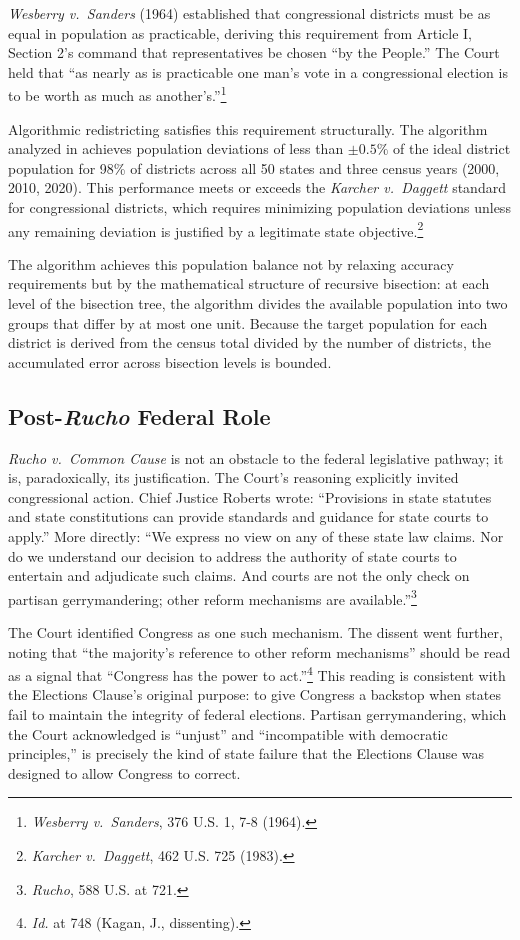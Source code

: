 \textit{Wesberry v.\ Sanders} (1964) established that congressional districts must be as equal in population as practicable, deriving this requirement from Article I, Section 2's command that representatives be chosen ``by the People.'' The Court held that ``as nearly as is practicable one man's vote in a congressional election is to be worth as much as another's.''\footnote{\textit{Wesberry v.\ Sanders}, 376 U.S. 1, 7-8 (1964).}

Algorithmic redistricting satisfies this requirement structurally. The algorithm analyzed in \citet{dellaLibera2026recursive} achieves population deviations of less than $\pm 0.5\%$ of the ideal district population for 98\% of districts across all 50 states and three census years (2000, 2010, 2020). This performance meets or exceeds the \textit{Karcher v.\ Daggett} standard for congressional districts, which requires minimizing population deviations unless any remaining deviation is justified by a legitimate state objective.\footnote{\textit{Karcher v.\ Daggett}, 462 U.S. 725 (1983).}

The algorithm achieves this population balance not by relaxing accuracy requirements but by the mathematical structure of recursive bisection: at each level of the bisection tree, the algorithm divides the available population into two groups that differ by at most one unit. Because the target population for each district is derived from the census total divided by the number of districts, the accumulated error across bisection levels is bounded.

\subsection{Post-\textit{Rucho} Federal Role}

\textit{Rucho v.\ Common Cause} is not an obstacle to the federal legislative pathway; it is, paradoxically, its justification. The Court's reasoning explicitly invited congressional action. Chief Justice Roberts wrote: ``Provisions in state statutes and state constitutions can provide standards and guidance for state courts to apply.'' More directly: ``We express no view on any of these state law claims. Nor do we understand our decision to address the authority of state courts to entertain and adjudicate such claims. And courts are not the only check on partisan gerrymandering; other reform mechanisms are available.''\footnote{\textit{Rucho}, 588 U.S. at 721.}

The Court identified Congress as one such mechanism. The dissent went further, noting that ``the majority's reference to other reform mechanisms'' should be read as a signal that ``Congress has the power to act.''\footnote{\textit{Id.} at 748 (Kagan, J., dissenting).} This reading is consistent with the Elections Clause's original purpose: to give Congress a backstop when states fail to maintain the integrity of federal elections. Partisan gerrymandering, which the Court acknowledged is ``unjust'' and ``incompatible with democratic principles,'' is precisely the kind of state failure that the Elections Clause was designed to allow Congress to correct.

